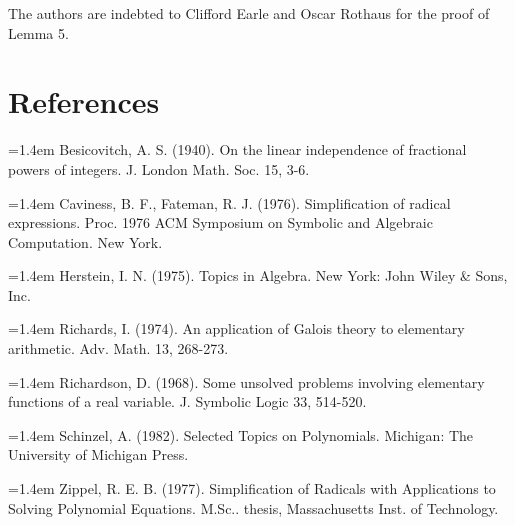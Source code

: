 \documentclass[11pt,letterpaper]{article}
\begin{document}
The authors are indebted to Clifford Earle and Oscar Rothaus for the proof of Lemma 5.

\section*{References}

\begingroup\small\setlength{\parindent}{0pt}
\hangindent=1.4em Besicovitch, A. S. (1940). On the linear independence of fractional powers of integers. J. London Math. Soc. 15, 3-6.

\hangindent=1.4em Caviness, B. F., Fateman, R. J. (1976). Simplification of radical expressions. Proc. 1976 ACM Symposium on Symbolic and Algebraic Computation. New York.

\hangindent=1.4em Herstein, I. N. (1975). Topics in Algebra. New York: John Wiley \& Sons, Inc.

\hangindent=1.4em Richards, I. (1974). An application of Galois theory to elementary arithmetic. Adv. Math. 13, 268-273.

\hangindent=1.4em Richardson, D. (1968). Some unsolved problems involving elementary functions of a real variable. J. Symbolic Logic 33, 514-520.

\hangindent=1.4em Schinzel, A. (1982). Selected Topics on Polynomials. Michigan: The University of Michigan Press.

\hangindent=1.4em Zippel, R. E. B. (1977). Simplification of Radicals with Applications to Solving Polynomial Equations. M.Sc.. thesis, Massachusetts Inst. of Technology.
\endgroup
\end{document}
